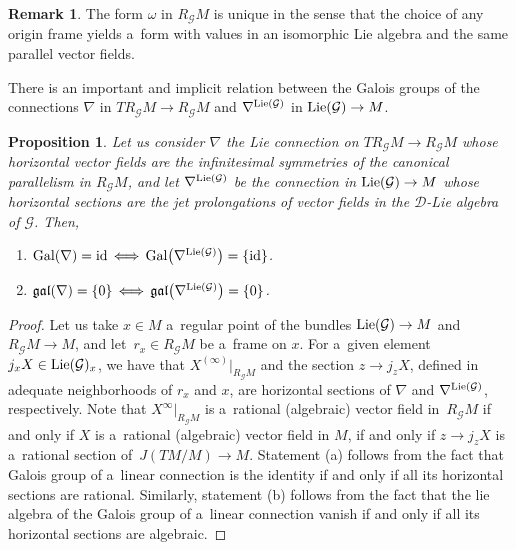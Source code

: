 \documentclass[10pt,a4paper]{amsart}
\numberwithin{equation}{section}
\newtheorem{Proposition}[Theorem]{Proposition}
\theoremstyle{definition}
\newtheorem{Remark}[Theorem]{Remark}
\begin{document}
\begin{Remark}
The form $\omega$ in $R_{\mathcal G}M$ is unique in the sense that the choice of any origin frame yields a~form with values in an isomorphic Lie algebra and the same parallel vector fields.
\end{Remark}

There is an important and implicit relation between the Galois groups of the connections $\nabla$ in $TR_\mathcal GM\to R_\mathcal GM$ and $\nabla^{{\rm Lie}(\mathcal G)}$ in ${\rm Lie}(\mathcal G)\to M$.

\begin{Proposition}\label{prp_Gal_Gal}
Let us consider $\nabla$ the Lie connection on $TR_\mathcal GM\to R_\mathcal GM$ whose horizontal vector fields are the infinitesimal symmetries of the canonical parallelism in $R_\mathcal GM$, and let $\nabla^{{\rm Lie}(\mathcal G)}$ be the connection in ${\rm Lie}(\mathcal G)\to M$ whose horizontal sections are the jet prolongations of vector fields in the $\mathcal D$-Lie algebra of $\mathcal G$. Then,
\begin{enumerate}\itemsep=0pt
 \item[$(a)$] ${\rm Gal}(\nabla) = {\rm id} \, \Longleftrightarrow \, {\rm Gal}\bigl(\nabla^{{\rm Lie}(\mathcal G)}\bigr) = \{\rm id\}$.
 \item[$(b)$] $\mathfrak{gal}(\nabla) = \{0\} \, \Longleftrightarrow \, \mathfrak{gal}\bigl(\nabla^{{\rm Lie}(\mathcal G)}\bigr) = \{\rm 0\}$.
\end{enumerate}
\end{Proposition}

\begin{proof}
Let us take $x\in M$ a~regular point of the bundles ${\rm Lie}(\mathcal G)\to M$ and $R_{\mathcal G}M\to M$, and let~${r_x \in R_{\mathcal G}M}$ be a~frame on $x$. For a~given element $j_xX\in {\rm Lie}(\mathcal G)_x$, we have that $X^{(\infty)}|_{R_\mathcal GM}$ and the section $z\to j_zX$, defined in adequate neighborhoods of $r_x$ and $x$, are horizontal sections of $\nabla$ and $\nabla^{{\rm Lie}(\mathcal G)}$, respectively. Note that $X^{\infty}|_{R_{\mathcal G}M}$ is a~rational (algebraic) vector field in~${R_\mathcal GM}$ if and only if $X$ is a~rational (algebraic) vector field in $M$, if and only if $z\to j_zX$ is a~rational section of~${J(TM/M)\to M}$. Statement (a) follows from the fact that Galois group of a~linear connection is the identity if and only if all its horizontal sections are rational. Similarly, statement (b) follows from the fact that the lie algebra of the Galois group of a~linear connection vanish if and only if all its horizontal sections are algebraic.
\end{proof}
\end{document}
